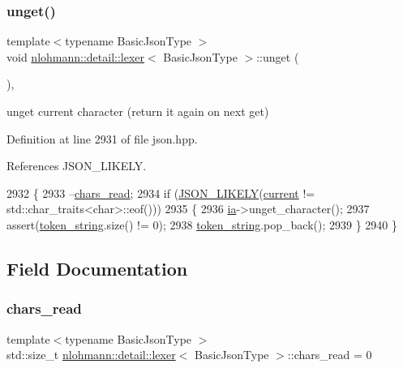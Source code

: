 \subsubsection{\texorpdfstring{unget()}{unget()}}
{\footnotesize\ttfamily template$<$typename Basic\+Json\+Type $>$ \\
void \hyperlink{classnlohmann_1_1detail_1_1lexer}{nlohmann\+::detail\+::lexer}$<$ Basic\+Json\+Type $>$\+::unget (\begin{DoxyParamCaption}{ }\end{DoxyParamCaption})\hspace{0.3cm}{\ttfamily [inline]}, {\ttfamily [private]}}



unget current character (return it again on next get) 



Definition at line 2931 of file json.\+hpp.



References J\+S\+O\+N\+\_\+\+L\+I\+K\+E\+LY.


\begin{DoxyCode}
2932     \{
2933         --\hyperlink{classnlohmann_1_1detail_1_1lexer_aab991bcbf230c372b276742f1790ba5b}{chars\_read};
2934         \textcolor{keywordflow}{if} (\hyperlink{json_8hpp_a41ecd1c4cf7c3d56477b9b685b5daa72}{JSON\_LIKELY}(\hyperlink{classnlohmann_1_1detail_1_1lexer_a47169f9aaf0da4c9885e61d3109859aa}{current} != std::char\_traits<char>::eof()))
2935         \{
2936             \hyperlink{classnlohmann_1_1detail_1_1lexer_aa7e69cd9d51451fd798eaf501b40421f}{ia}->unget\_character();
2937             assert(\hyperlink{classnlohmann_1_1detail_1_1lexer_ad2960e3d54af8fb8d572a8f6f7731d62}{token\_string}.size() != 0);
2938             \hyperlink{classnlohmann_1_1detail_1_1lexer_ad2960e3d54af8fb8d572a8f6f7731d62}{token\_string}.pop\_back();
2939         \}
2940     \}
\end{DoxyCode}


\subsection{Field Documentation}
\mbox{\label{classnlohmann_1_1detail_1_1lexer_aab991bcbf230c372b276742f1790ba5b}} 
\subsubsection{\texorpdfstring{chars\+\_\+read}{chars\_read}}
{\footnotesize\ttfamily template$<$typename Basic\+Json\+Type $>$ \\
std\+::size\+\_\+t \hyperlink{classnlohmann_1_1detail_1_1lexer}{nlohmann\+::detail\+::lexer}$<$ Basic\+Json\+Type $>$\+::chars\+\_\+read = 0\hspace{0.3cm}{\ttfamily [private]}}



